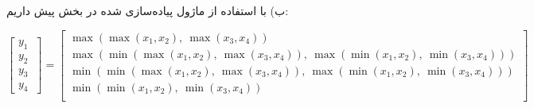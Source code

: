 ب) با استفاده از ماژول پیاده‌سازی شده در بخش پیش داریم:

$$
\begin{bmatrix}
y_1 \\ y_2 \ \\ y_3 \ \\ y_4 \ 
\end{bmatrix} =
\begin{bmatrix}
\max \left(\max(x_1, x_2),~\max(x_3, x_4) \right)\\

\max \left(\min \left(\max(x_1, x_2),~\max(x_3, x_4) \right),~\max \left(\min(x_1, x_2),~\min(x_3, x_4) \right) \right)\\

\min \left(\min \left(\max(x_1, x_2),~\max(x_3, x_4) \right),~\max \left(\min(x_1, x_2),~\min(x_3, x_4) \right) \right)\\

\min \left(\min(x_1, x_2),~\min(x_3, x_4) \right)\\

\end{bmatrix} 
$$
